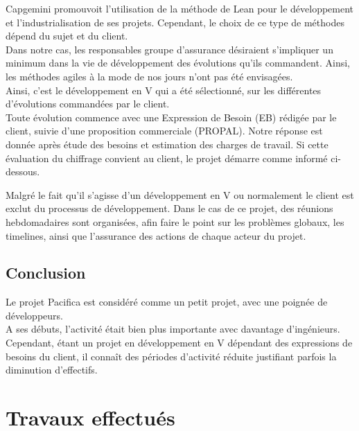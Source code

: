 \documentclass{rapport}
\begin{document}
Capgemini promouvoit l'utilisation de la méthode de Lean pour le développement et l'industrialisation de ses projets. Cependant, le choix de ce type de méthodes dépend du sujet et du client.\\ 
Dans notre cas, les responsables groupe d'assurance désiraient s'impliquer un minimum dans la vie de développement des évolutions qu'ils commandent. Ainsi, les méthodes agiles à la mode de nos jours n'ont pas été envisagées.\\

Ainsi, c'est le développement en V qui a été sélectionné, sur les différentes d'évolutions commandées par le client.\\


Toute évolution commence avec une Expression de Besoin (EB) rédigée par le client, suivie d'une proposition commerciale (PROPAL). Notre réponse est donnée après étude des besoins et estimation des charges de travail. Si cette évaluation du chiffrage convient au client, le projet démarre comme informé ci-dessous.


Malgré le fait qu'il s'agisse d'un développement en V ou normalement le client est exclut du processus de développement. Dans le cas de ce projet, des réunions hebdomadaires sont organisées, afin faire le point sur les problèmes globaux, les timelines, ainsi que l'assurance des actions de chaque acteur du projet.

\subsection*{Conclusion}

Le projet Pacifica est considéré comme un petit projet, avec une poignée de développeurs.\\
A ses débuts, l'activité était bien plus importante avec davantage d'ingénieurs. Cependant, étant un projet en développement en V dépendant des expressions de besoins du client, il connaît des périodes d'activité réduite justifiant parfois la diminution d'effectifs.\\


\newpage

\section{Travaux effectués}
\end{document}

